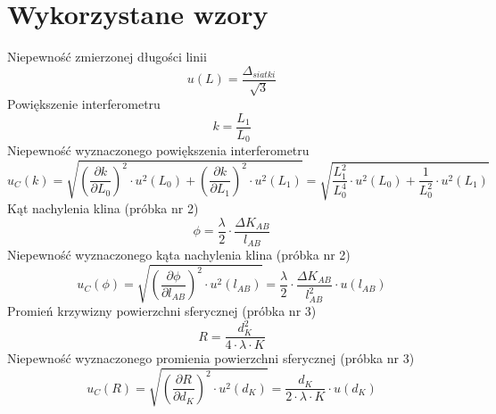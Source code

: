 \documentclass[12pt, a4paper, oneside]{article}
\begin{document}
\section{Wykorzystane wzory}
Niepewność zmierzonej długości linii
\begin{equation}
u(L)=\frac{\Delta_{siatki}}{\sqrt{3}}
\end{equation}
Powiększenie interferometru
\begin{equation}
k=\frac{L_1}{L_0}
\end{equation}
Niepewność wyznaczonego powiększenia interferometru
\begin{equation}
u_C(k)=\sqrt{(\frac{\partial k}{\partial L_0})^2\cdot u^2(L_0)+(\frac{\partial k}{\partial L_1})^2\cdot u^2(L_1)}=\sqrt{\frac{L_1^2}{L_0^4}\cdot u^2(L_0)+\frac{1}{L_0^2}\cdot u^2(L_1)}
\end{equation}
Kąt nachylenia klina (próbka nr 2)
\begin{equation}
\phi=\frac{\lambda}{2}\cdot\frac{\Delta K_{AB}}{l_{AB}}
\end{equation}
Niepewność wyznaczonego kąta nachylenia klina (próbka nr 2)
\begin{equation}
u_C(\phi)=\sqrt{(\frac{\partial\phi}{\partial l_{AB}})^2\cdot u^2(l_{AB})}=\frac{\lambda}{2}\cdot\frac{\Delta K_{AB}}{l^2_{AB}}\cdot u(l_{AB})
\end{equation}
Promień krzywizny powierzchni sferycznej (próbka nr 3)
\begin{equation}
R=\frac{d_K^2}{4\cdot\lambda\cdot K}
\end{equation}
Niepewność wyznaczonego promienia powierzchni sferycznej (próbka nr 3)
\begin{equation}
u_C(R)=\sqrt{(\frac{\partial R}{\partial d_K})^2\cdot u^2(d_K)}=\frac{d_K}{2\cdot\lambda\cdot K}\cdot u(d_K)
\end{equation}
\end{document}
